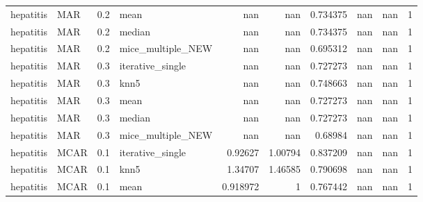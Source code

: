 \begin{table}[ht]
\begin{tabular}{llrlrrrrrr}
 hepatitis       & MAR         &         0.2 & mean              &     nan        &           nan        &              0.734375  &                       nan        &                    nan         &         1 \\
 hepatitis       & MAR         &         0.2 & median            &     nan        &           nan        &              0.734375  &                       nan        &                    nan         &         1 \\
 hepatitis       & MAR         &         0.2 & mice\_multiple\_NEW &     nan        &           nan        &              0.695312  &                       nan        &                    nan         &         1 \\
 hepatitis       & MAR         &         0.3 & iterative\_single  &     nan        &           nan        &              0.727273  &                       nan        &                    nan         &         1 \\
 hepatitis       & MAR         &         0.3 & knn5              &     nan        &           nan        &              0.748663  &                       nan        &                    nan         &         1 \\
 hepatitis       & MAR         &         0.3 & mean              &     nan        &           nan        &              0.727273  &                       nan        &                    nan         &         1 \\
 hepatitis       & MAR         &         0.3 & median            &     nan        &           nan        &              0.727273  &                       nan        &                    nan         &         1 \\
 hepatitis       & MAR         &         0.3 & mice\_multiple\_NEW &     nan        &           nan        &              0.68984   &                       nan        &                    nan         &         1 \\
 hepatitis       & MCAR        &         0.1 & iterative\_single  &       0.92627  &             1.00794  &              0.837209  &                       nan        &                    nan         &         1 \\
 hepatitis       & MCAR        &         0.1 & knn5              &       1.34707  &             1.46585  &              0.790698  &                       nan        &                    nan         &         1 \\
 hepatitis       & MCAR        &         0.1 & mean              &       0.918972 &             1        &              0.767442  &                       nan        &                    nan         &         1 \\

\end{tabular}
\end{table}
